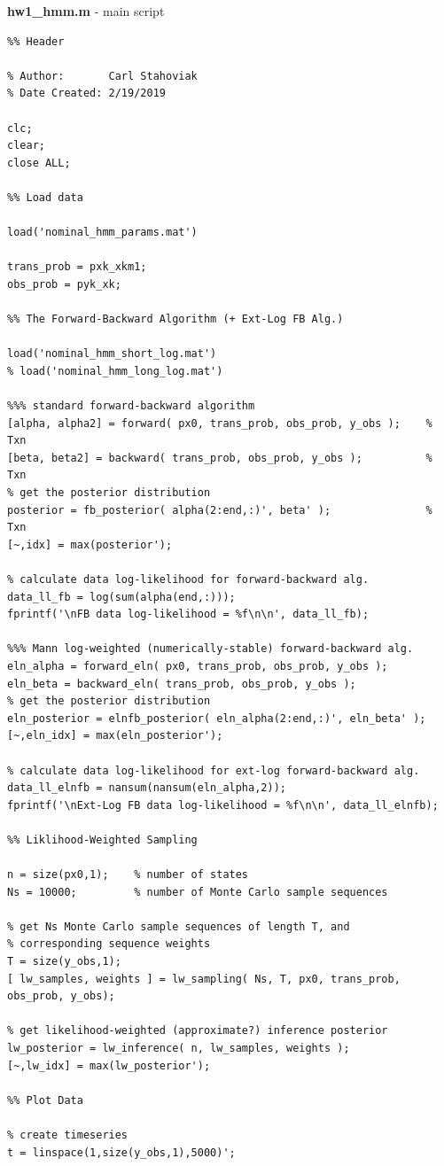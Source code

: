 \documentclass[]{article}
\begin{document}
\textbf{hw1\_hmm.m} - main script
\begin{lstlisting}
%% Header

% Author: 		Carl Stahoviak
% Date Created:	2/19/2019

clc;
clear;
close ALL;

%% Load data

load('nominal_hmm_params.mat')

trans_prob = pxk_xkm1;
obs_prob = pyk_xk;

%% The Forward-Backward Algorithm (+ Ext-Log FB Alg.)

load('nominal_hmm_short_log.mat')
% load('nominal_hmm_long_log.mat')

%%% standard forward-backward algorithm
[alpha, alpha2] = forward( px0, trans_prob, obs_prob, y_obs );    % Txn
[beta, beta2] = backward( trans_prob, obs_prob, y_obs );          % Txn
% get the posterior distribution
posterior = fb_posterior( alpha(2:end,:)', beta' );               % Txn
[~,idx] = max(posterior');

% calculate data log-likelihood for forward-backward alg.
data_ll_fb = log(sum(alpha(end,:)));
fprintf('\nFB data log-likelihood = %f\n\n', data_ll_fb);

%%% Mann log-weighted (numerically-stable) forward-backward alg.
eln_alpha = forward_eln( px0, trans_prob, obs_prob, y_obs );
eln_beta = backward_eln( trans_prob, obs_prob, y_obs );
% get the posterior distribution
eln_posterior = elnfb_posterior( eln_alpha(2:end,:)', eln_beta' );
[~,eln_idx] = max(eln_posterior');

% calculate data log-likelihood for ext-log forward-backward alg.
data_ll_elnfb = nansum(nansum(eln_alpha,2));
fprintf('\nExt-Log FB data log-likelihood = %f\n\n', data_ll_elnfb);

%% Liklihood-Weighted Sampling

n = size(px0,1);    % number of states
Ns = 10000;         % number of Monte Carlo sample sequences

% get Ns Monte Carlo sample sequences of length T, and 
% corresponding sequence weights
T = size(y_obs,1);
[ lw_samples, weights ] = lw_sampling( Ns, T, px0, trans_prob, obs_prob, y_obs);

% get likelihood-weighted (approximate?) inference posterior
lw_posterior = lw_inference( n, lw_samples, weights );
[~,lw_idx] = max(lw_posterior');

%% Plot Data

% create timeseries
t = linspace(1,size(y_obs,1),5000)';


\end{lstlisting}
\end{document}
